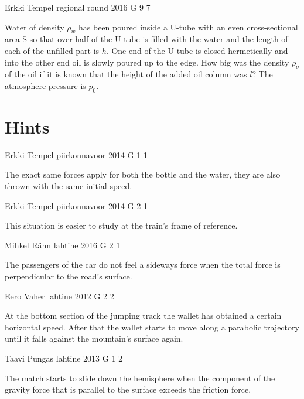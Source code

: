 \documentclass[11pt]{article}
\begin{document}
{Erkki Tempel} %
{regional round} %
{2016} %
{G 9} %
{7} %
{

\ifEngStatement
Water of density $\rho_w$ has been poured inside a U-tube with an even cross-sectional area S so that over half of the U-tube is filled with the water and the length of each of the unfilled part is $h$. One end of the U-tube is closed hermetically and into the other end oil is slowly poured up to the edge. How big was the density $\rho_{o}$ of the oil if it is known that the height of the added oil column was $l$? The atmosphere pressure is $p_0$.
\fi
}
\newpage\normalsize\section{Hints}
        \ToggleEngHint
        
{Erkki Tempel} %
{piirkonnavoor} %
{2014} %
{G 1} %
{1} %
{

\ifEngHint
The exact same forces apply for both the bottle and the water, they are also thrown with the same initial speed.
\fi
}

{Erkki Tempel} %
{piirkonnavoor} %
{2014} %
{G 2} %
{1} %
{

\ifEngHint
This situation is easier to study at the train’s frame of reference.
\fi
}

{Mihkel Rähn} %
{lahtine} %
{2016} %
{G 2} %
{1} %
{

\ifEngHint
The passengers of the car do not feel a sideways force when the total force is perpendicular to the road’s surface.
\fi
}

{Eero Vaher} %
{lahtine} %
{2012} %
{G 2} %
{2} %
{

\ifEngHint
At the bottom section of the jumping track the wallet has obtained a certain horizontal speed. After that the wallet starts to move along a parabolic trajectory until it falls against the mountain’s surface again.
\fi
}

{Taavi Pungas} %
{lahtine} %
{2013} %
{G 1} %
{2} %
{

\ifEngHint
The match starts to slide down the hemisphere when the component of the gravity force that is parallel to the surface exceeds the friction force.
\fi
}
\end{document}
